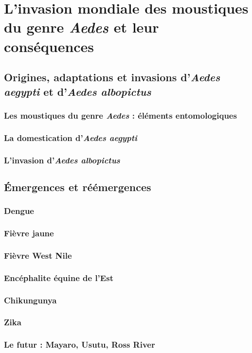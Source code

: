 \chapter{L'invasion mondiale des moustiques du genre {\em Aedes} et leur conséquences}

\section{Origines, adaptations et invasions d'{\em Aedes aegypti} et d'{\em Aedes albopictus}}

\subsection{Les moustiques du genre {\em Aedes} : éléments entomologiques}

\subsection{La domestication d'{\em Aedes aegypti}}

\subsection{L'invasion d'{\em Aedes albopictus} }

\section{ Émergences et réémergences}

\subsection{Dengue   }

\subsection{Fièvre jaune   }

\subsection{Fièvre  West Nile}

\subsection{Encéphalite équine de l'Est}

\subsection{Chikungunya}

\subsection{Zika}

\subsection{Le futur : Mayaro, Usutu, Ross River}

